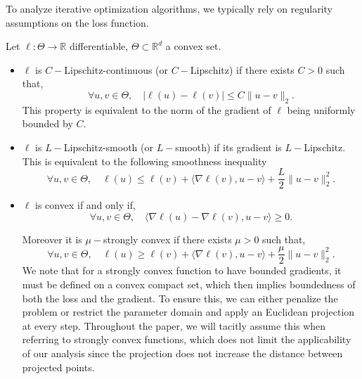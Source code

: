 \documentclass[twoside,11pt]{article}
\newcommand\mb{\mathbb}
\begin{document}
To analyze iterative optimization algorithms, we typically rely on regularity assumptions on the loss function.
\begin{definition}
    Let $\ell: \Theta \to \mb{R}$ differentiable, $\Theta \subset \mb{R}^d$ a convex set. 
    \begin{itemize}       
        \item[\textit{(i)}] $\ell$ is $C-$Lipschitz-continuous (or $C-$Lipschitz) if there exists $C>0$ such that,
        \[
            \forall u, v \in \Theta,\quad |\ell(u)-\ell(v)| \leq C \|u-v\|_2.
        \] 
        This property is equivalent to the norm of the gradient of $\ell$ being uniformly bounded by $C$.
        
        \item[\textit{(ii)}] $\ell$ is $L-$Lipschitz-smooth (or $L-$smooth) if its gradient is $L-$Lipschitz. 
        This is equivalent to the following smoothness inequality
        \begin{equation}\label{smoothness-ineq2}
            \forall u, v \in \Theta,\quad \ell(u) \leq \ell(v) + \langle \nabla \ell(v), u-v \rangle + \frac{L}{2} \| u-v \|_2^2.
        \end{equation}

        \item[\textit{(iii)}] $\ell$ is convex if and only if,
        \begin{equation}\label{eq:convex-ineq}
            \forall u, v \in \Theta,\quad \langle \nabla \ell (u) - \nabla \ell (v), u-v\rangle \geq 0.
        \end{equation}
        
        Moreover it is $\mu-$strongly convex if there exists $\mu > 0$ such that,
        \begin{equation}\label{eq:strg-convex-ineq}
            \forall u, v \in \Theta,\quad \ell(u) \geq \ell(v) + \langle \nabla \ell(v), u-v \rangle + \frac{\mu}{2} \| u-v \|_2^2.
        \end{equation}
        We note that for a strongly convex function to have bounded gradients, it must be defined on a convex compact set, which then implies boundedness of both the loss and the gradient. 
        To ensure this, we can either penalize the problem or restrict the parameter domain and apply an Euclidean projection at every step. Throughout the paper, we will tacitly assume this when referring to strongly convex functions, 
        which does not limit the applicability of our analysis since the projection does not increase the distance between projected points.
    \end{itemize}
\end{definition}
\end{document}
